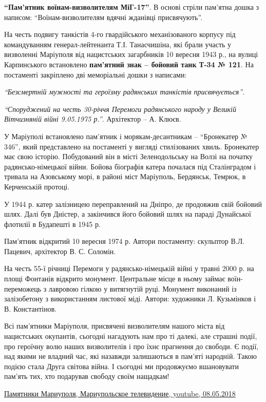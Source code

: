 \textbf{\enquote{Пам'ятник воїнам-визволителям МіГ-17}}. В основі стріли пам'ятна дошка з
написом: \enquote{Воїнам-визволителям вдячні жданівці присвячують}.


На честь подвигу танкістів 4-го гвардійського механізованого корпусу під
командуванням генерал-лейтенанта Т.І. Танасчишіна, які брали участь у
визволенні Маріуполя від нацистських загарбників 10 вересня 1943 р.,  на вулиці
Карпинського встановлено \textbf{пам'ятний знак – бойовий танк Т-34 № 121}. На
постаменті закріплено дві меморіальні дошки з написами:

\emph{\enquote{Безсмертній мужності та героїзму радянських танкістів присвячується}}.

\emph{\enquote{Споруджений на честь 30-річчя Перемоги радянського народу у Великій
Вітчизняній війні 9.05.1975 р.}}. Архітектор – А. Клюєв.


У Маріуполі встановлено пам'ятник і морякам-десантникам – \enquote{Бронекатер № 346},
який представлено на постаменті у вигляді стилізованих хвиль. Бронекатер має
свою історію. Побудований він в місті Зеленодольську на Волзі на початку
радянсько-німецької війни. Бойова біографія катера почалася під Сталінградом і
тривала на Азовському морі, в районі міст Маріуполь, Бердянськ, Темрюк, в
Керченській протоці.

У 1944 р. катер залізницею переправлений на Дніпро, де продовжив свій бойовий
шлях. Далі був Дністер, а закінчився його бойовий шлях на параді Дунайської
флотилії в Будапешті в 1945 р.

Пам'ятник відкритий 10 вересня 1974 р. Автори постаменту: скульптор В.Л.
Пацевич, архітектор В. С. Соломін.


На честь 55-ї річниці Перемоги у радянсько-німецькій війні у травні 2000 р. на
площі Фонтанів відкрито монумент. Центральне місце в ньому займає
воїн-переможець з лавровою гілкою у витягнутій руці. Монумент виконаний із
залізобетону з використанням листової міді. Автори: художники Л. Кузьмінков і
В. Константінов.


Всі пам'ятники Маріуполя, присвячені визволителям нашого міста від нацистських
окупантів, сьогодні нагадують нам про ті далекі, але страшні події, про
героїчну волю наших визволителів і про їхнє прагнення до свободи. Є події, над
якими не владний час, які назавжди залишаються в пам'яті народній. Такою подією
стала Друга світова війна. І сьогодні ми продовжуємо вшановувати пам'ять тих,
хто подарував свободу своїм нащадкам! 

\href{https://youtu.be/czLn_KCfByU}{%
Памятники Мариуполя, Мариупольское телевидение, youtube, 08.05.2018%
}



